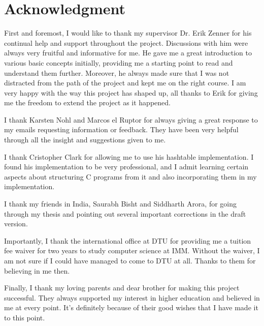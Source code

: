 
\chapter*{Acknowledgment}

First and foremost, I would like to thank my supervisor Dr. Erik Zenner for his continual help and support throughout the project. Discussions with him were always very fruitful and informative for me. He gave me a great introduction to various basic concepts initially, providing me a starting point to read and understand them further. Moreover, he always made sure that I was not distracted from the path of the project and kept me on the right course. I am very happy with the way this project has shaped up, all thanks to Erik for giving me the freedom to extend the project as it happened. 

I thank Karsten Nohl and Marcos el Ruptor for always giving a great response to my emails requesting information or feedback. They have been very helpful through all the insight and suggestions given to me. 

I thank Cristopher Clark for allowing me to use his hashtable implementation. I found his implementation to be very professional, and I admit learning certain aspects about structuring C programs from it and also incorporating them in my implementation. 

I thank my friends in India, Saurabh Bisht and Siddharth Arora, for going through my thesis and pointing out several important corrections in the draft version.

Importantly, I thank the international office at DTU for providing me a tuition fee waiver for two years to study computer science at IMM. Without the waiver, I am not sure if I could have managed to come to DTU at all. Thanks to them for believing in me then.

Finally, I thank my loving parents and dear brother for making this project successful. They always supported my interest in higher education and believed in me at every point. It's definitely because of their good wishes that I have made it to this point. 